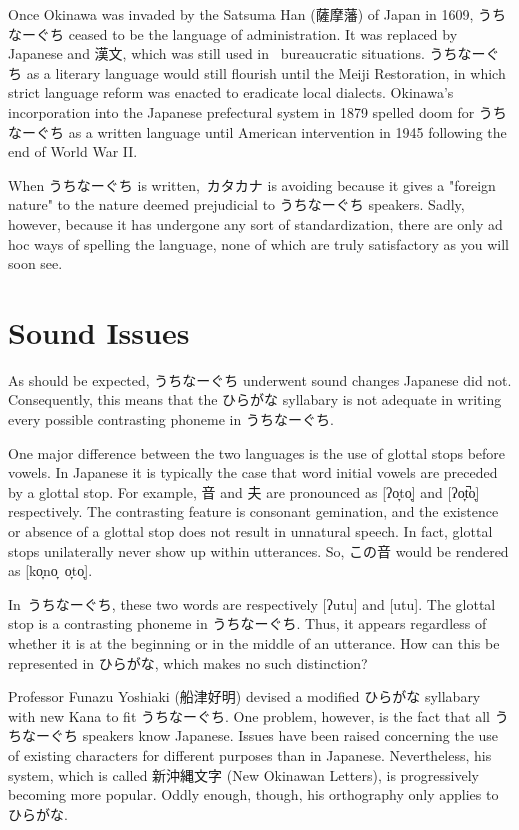 \par{ Once Okinawa was invaded by the Satsuma Han (薩摩藩) of Japan in 1609, うちなーぐち ceased to be the language of administration. It was replaced by Japanese and 漢文, which was still used in  bureaucratic situations. うちなーぐち as a literary language would still flourish until the Meiji Restoration, in which strict language reform was enacted to eradicate local dialects. Okinawa's incorporation into the Japanese prefectural system in 1879 spelled doom for うちなーぐち as a written language until American intervention in 1945 following the end of World War II. }

\par{ When うちなーぐち is written, カタカナ is avoiding because it gives a "foreign nature" to the nature deemed prejudicial to うちなーぐち speakers. Sadly, however, because it has undergone any sort of standardization, there are only ad hoc ways of spelling the language, none of which are truly satisfactory as you will soon see. }
      
\section{Sound Issues}
 
\par{ As should be expected, うちなーぐち underwent sound changes Japanese did not. Consequently, this means that the ひらがな syllabary is not adequate in writing every possible contrasting phoneme in うちなーぐち. }

\par{ One major difference between the two languages is the use of glottal stops before vowels. In Japanese it is typically the case that word initial vowels are preceded by a glottal stop. For example, 音 and 夫 are pronounced as [ʔo̞to̞] and [ʔo̞t̚o̞] respectively. The contrasting feature is consonant gemination, and the existence or absence of a glottal stop does not result in unnatural speech. In fact, glottal stops unilaterally never show up within utterances. So, この音 would be rendered as [ko̞no̞ o̞to̞]. }

\par{ In うちなーぐち, these two words are respectively [ʔutu] and [utu]. The glottal stop is a contrasting phoneme in うちなーぐち. Thus, it appears regardless of whether it is at the beginning or in the middle of an utterance. How can this be represented in ひらがな, which makes no such distinction? }

\par{ Professor Funazu Yoshiaki (船津好明) devised a modified ひらがな syllabary with new Kana to fit うちなーぐち. One problem, however, is the fact that all うちなーぐち speakers know Japanese. Issues have been raised concerning the use of existing characters for different purposes than in Japanese. Nevertheless, his system, which is called 新沖縄文字 (New Okinawan Letters), is progressively becoming more popular. Oddly enough, though, his orthography only applies to ひらがな. }

